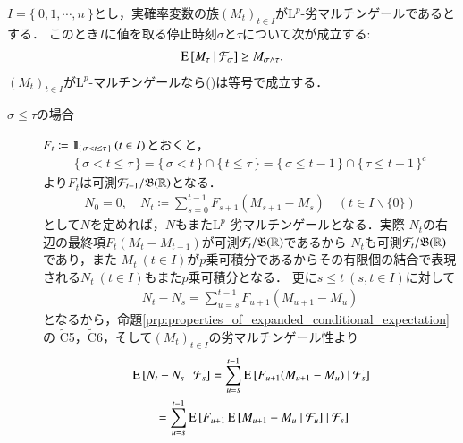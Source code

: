 	\begin{itembox}[l]{}
		\begin{thm}[任意抽出定理(1)]
			$I = \{\ 0,1,\cdots,n\ \}$とし，実確率変数の族$(M_t)_{t \in I}$が$\mathrm{L}^p$-劣マルチンゲールであるとする．
			このとき$I$に値を取る停止時刻$\sigma$と$\tau$について次が成立する:
			\begin{align}
				\operatorname{E} \left[ M_\tau \ \middle|\ \mathcal{F}_\sigma \right] \geq M_{\sigma \wedge \tau}.
				\label{eq:thm_optional_sampling_theorem_1}
			\end{align}
			$(M_t)_{t \in I}$が$\mathrm{L}^p$-マルチンゲールなら()は等号で成立する．
			\label{thm:optional_sampling_theorem_1}
		\end{thm}
	\end{itembox}
	
	\begin{prf}\mbox{}
		\begin{description}
			\item[$\sigma \leq \tau$の場合]
				$F_t \coloneqq \mbox{1}\hspace{-0.25em}\mbox{l}_{\{\, \sigma < t \leq \tau\, \}}\ (t \in I)$とおくと，
				\begin{align}
					\{\, \sigma < t \leq \tau\, \} = \{\, \sigma < t\, \} \cap \{\, t \leq \tau\, \} = \{\, \sigma \leq t-1\, \} \cap \{\, \tau \leq t-1\, \}^c
				\end{align}
				より$F_t$は可測$\mathcal{F}_{t-1}/\mathfrak{B}(\mathbb{R})$となる．
				\begin{align}
					N_0 = 0,\quad N_t \coloneqq \sum_{s=0}^{t-1} F_{s+1}(M_{s+1} - M_s) \quad (t \in I \backslash \{0\})
				\end{align}
				として$N$を定めれば，$N$もまた$\mathrm{L}^p$-劣マルチンゲールとなる．実際
				$N_t$の右辺の最終項$F_t(M_t - M_{t-1})$が可測$\mathcal{F}_t/\mathfrak{B}(\mathbb{R})$であるから
				$N_t$も可測$\mathcal{F}_t/\mathfrak{B}(\mathbb{R})$であり，また
				$M_t\ (t \in I)$が$p$乗可積分であるからその有限個の結合で表現される$N_t\ (t \in I)$もまた$p$乗可積分となる．
				更に$s \leq t\ (s,t \in I)$に対して
				\begin{align}
					N_t - N_s = \sum_{u=s}^{t-1} F_{u+1}(M_{u+1} - M_u)
				\end{align}
				となるから，命題\ref{prp:properties_of_expanded_conditional_expectation}の
				$\tilde{\mathrm{C}}$5，$\tilde{\mathrm{C}}$6，そして$(M_t)_{t \in I}$の劣マルチンゲール性より
				\begin{align}
					&\cexp{N_t - N_s}{\mathcal{F}_s}
					= \sum_{u=s}^{t-1} \cexp{F_{u+1}(M_{u+1} - M_u)}{\mathcal{F}_s} \\
					&\qquad= \sum_{u=s}^{t-1} \cexp{F_{u+1}\cexp{M_{u+1} - M_u}{\mathcal{F}_u}}{\mathcal{F}_s}

\end{align}
\end{description}
\end{prf}
